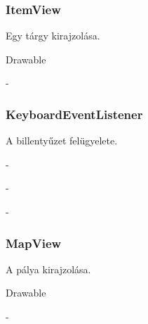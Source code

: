 \subsubsection{ItemView}
\begin{class-template-responsibility}
    Egy tárgy kirajzolása.
\end{class-template-responsibility}
\begin{class-template-interface}
    Drawable
\end{class-template-interface}
\begin{class-template-baseclass}
    -
\end{class-template-baseclass}
\begin{class-template-attribute}
\end{class-template-attribute}
\begin{class-template-method}
    \classitem{}{}
\end{class-template-method}

\subsubsection{KeyboardEventListener}
\begin{class-template-responsibility}
    A billentyűzet felügyelete.
\end{class-template-responsibility}
\begin{class-template-interface}
    -
\end{class-template-interface}
\begin{class-template-baseclass}
    -
\end{class-template-baseclass}
\begin{class-template-attribute}
    -
\end{class-template-attribute}
\begin{class-template-method}
\end{class-template-method}

\subsubsection{MapView}
\begin{class-template-responsibility}
    A pálya kirajzolása.
\end{class-template-responsibility}
\begin{class-template-interface}
    Drawable
\end{class-template-interface}
\begin{class-template-baseclass}
    -
\end{class-template-baseclass}
\begin{class-template-attribute}
\end{class-template-attribute}
\begin{class-template-method}
\end{class-template-method}

